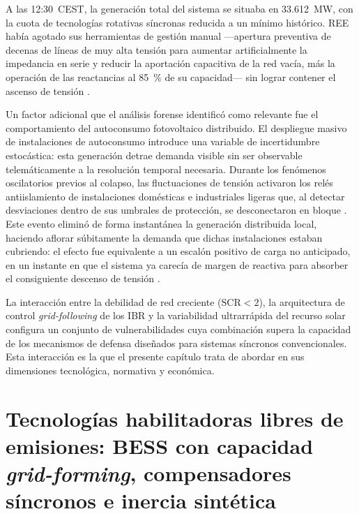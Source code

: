 A las 12:30~CEST, la generación total del sistema se situaba en
33.612~MW, con la cuota de tecnologías rotativas síncronas reducida a
un mínimo histórico. REE había agotado sus herramientas de gestión
manual ---apertura preventiva de decenas de líneas de muy alta tensión
para aumentar artificialmente la impedancia en serie y reducir la
aportación capacitiva de la red vacía, más la operación de las
reactancias al 85~\% de su capacidad--- sin lograr contener el ascenso
de tensión \cite{icai2025,gobierno2025}.

Un factor adicional que el análisis forense identificó como relevante fue
el comportamiento del autoconsumo fotovoltaico distribuido. El despliegue
masivo de instalaciones de autoconsumo introduce una variable de
incertidumbre estocástica: esta generación detrae demanda visible sin
ser observable telemáticamente a la resolución temporal necesaria.
Durante los fenómenos oscilatorios previos al colapso, las fluctuaciones
de tensión activaron los relés antiislamiento de instalaciones domésticas
e industriales ligeras que, al detectar desviaciones dentro de sus
umbrales de protección, se desconectaron en bloque \cite{mitceepr2025}.
Este evento eliminó de forma instantánea la generación distribuida local,
haciendo aflorar súbitamente la demanda que dichas instalaciones estaban
cubriendo: el efecto fue equivalente a un escalón positivo de carga no
anticipado, en un instante en que el sistema ya carecía de margen de
reactiva para absorber el consiguiente descenso de tensión
\cite{mitceepr2025,gobierno2025}.

La interacción entre la debilidad de red creciente ($\mathrm{SCR} < 2$),
la arquitectura de control \textit{grid-following} de los IBR y la
variabilidad ultrarrápida del recurso solar configura un conjunto de
vulnerabilidades cuya combinación supera la capacidad de los mecanismos
de defensa diseñados para sistemas síncronos convencionales. Esta
interacción es la que el presente capítulo trata de abordar en sus
dimensiones tecnológica, normativa y económica.

\section{Tecnologías habilitadoras libres de emisiones: BESS con
capacidad \textit{grid-forming}, compensadores síncronos e inercia
sintética}
\label{sec:tecnologias_habilitadoras}

